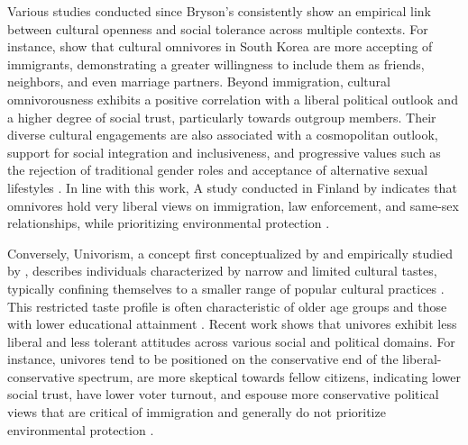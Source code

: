 \documentclass[12pt]{article}
\begin{document}
Various studies conducted since Bryson's consistently show an empirical link between cultural openness and social tolerance across multiple contexts. For instance, \citet{cho2023are-61e} show that cultural omnivores in South Korea are more accepting of immigrants, demonstrating a greater willingness to include them as friends, neighbors, and even marriage partners. Beyond immigration, cultural omnivorousness exhibits a positive correlation with a liberal political outlook and a higher degree of social trust, particularly towards outgroup members. Their diverse cultural engagements are also associated with a cosmopolitan outlook, support for social integration and inclusiveness, and progressive values such as the rejection of traditional gender roles and acceptance of alternative sexual lifestyles \citep{chan2019understanding-1d0}. In line with this work, A study conducted in Finland by \citep{lindblom2022growing-ded} indicates that omnivores hold very liberal views on immigration, law enforcement, and same-sex relationships, while prioritizing environmental protection \citep{lindblom2022growing-ded}. 

Conversely, Univorism, a concept first conceptualized by \citet{peterson1992understanding-ce3} and empirically studied by \citet{bryson1997what-933}, describes individuals characterized by narrow and limited cultural tastes, typically confining themselves to a smaller range of popular cultural practices \citep{lindblom2022growing-ded, cho2023are-61e}. This restricted taste profile is often characteristic of older age groups and those with lower educational attainment \citep{sokolova2020does-65c, lindblom2019anything-530}. Recent work shows that univores exhibit less liberal and less tolerant attitudes across various social and political domains. For instance, univores tend to be positioned on the conservative end of the liberal-conservative spectrum, are more skeptical towards fellow citizens, indicating lower social trust,  have lower voter turnout, and espouse more conservative political views that are critical of immigration and generally do not prioritize environmental protection \citep{lindblom2022growing-ded, cho2023are-61e, chan2019understanding-1d0}. 
\end{document}
